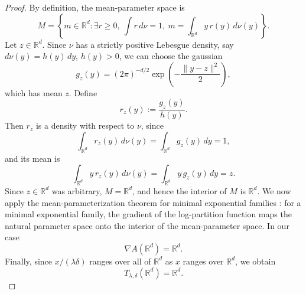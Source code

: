 \documentclass{article}
\newcommand{\R}{\mathbb{R}}
\begin{document}
\begin{proof}
By definition, the mean-parameter space is \cite[Equation (3.26)]{WainwrightJordan2008}
\[M=
    \left\{
    m\in\mathbb{R}^d:
    \exists r\geq 0,\ \int r\,d\nu=1,\ 
    m=\int_{\mathbb{R}^d} y\,r(y)\,d\nu(y)
    \right\}.
\]
Let \(z\in\mathbb{R}^d\). Since \(\nu\) has a strictly positive Lebesgue density, say $d\nu(y)=h(y)\,dy$, $h(y)>0$, we can choose the gaussian
\[
    g_z(y)
    =
    (2\pi)^{-d/2}
    \exp\left(-\frac{\|y-z\|^2}{2}\right),
\]
which has mean \(z\). Define
\[
    r_z(y):=\frac{g_z(y)}{h(y)}.
\]
Then \(r_z\) is a density with respect to \(\nu\), since
\[
    \int_{\mathbb{R}^d} r_z(y)\,d\nu(y)
    =
    \int_{\mathbb{R}^d} g_z(y)\,dy
    =
    1,
\]
and its mean is
\[
    \int_{\mathbb{R}^d} y\,r_z(y)\,d\nu(y)
    =
    \int_{\mathbb{R}^d} y\,g_z(y)\,dy
    =
    z.
\]
Since \(z\in\mathbb{R}^d\) was arbitrary, \(M=\mathbb{R}^d\), and hence
the interior of $M$ is $\R^d$. We now apply the mean-parameterization theorem for minimal exponential families \cite[Theorem 3.3]{WainwrightJordan2008}: for a minimal exponential family, the gradient of the log-partition function maps the natural parameter space onto the interior of the mean-parameter space. In our case
\[
    \nabla A(\mathbb{R}^d)=\mathbb{R}^d .
\]
Finally, since \(x/(\lambda\delta)\) ranges over all of \(\mathbb{R}^d\) as
\(x\) ranges over \(\mathbb{R}^d\), we obtain
\[
    T_{\lambda,\delta}(\mathbb{R}^d)
    =
    \mathbb{R}^d .
\]
\end{proof}
\end{document}
